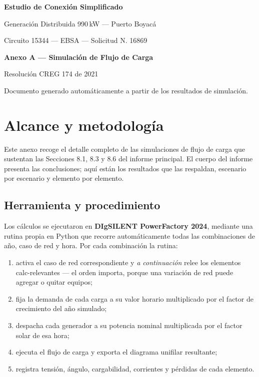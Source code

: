 \documentclass[11pt,a4paper]{article}
\begin{document}
\begin{titlepage}
\centering
\vspace*{3cm}
{\Large\bfseries Estudio de Conexi\'on Simplificado\par}
\vspace{0.4cm}
{\large Generaci\'on Distribuida 990\,kW --- Puerto Boyac\'a\par}
\vspace{0.2cm}
{\large Circuito 15344 --- EBSA --- Solicitud N.\textdegree{} 16869\par}
\vspace{2.5cm}
{\Huge\bfseries Anexo A --- Simulaci\'on de Flujo de Carga\par}
\vspace{2cm}
{\large Resoluci\'on CREG 174 de 2021\par}
\vfill
{\small Documento generado autom\'aticamente a partir de los resultados de simulaci\'on.\par}
\end{titlepage}

\tableofcontents
\newpage


\section{Alcance y metodolog\'ia}

Este anexo recoge el detalle completo de las simulaciones de flujo de carga que
sustentan las Secciones 8.1, 8.3 y 8.6 del informe principal. El cuerpo del
informe presenta las conclusiones; aqu\'i est\'an los resultados que las
respaldan, escenario por escenario y elemento por elemento.

\subsection{Herramienta y procedimiento}

Los c\'alculos se ejecutaron en \textbf{DIgSILENT PowerFactory 2024}, mediante
una rutina propia en Python que recorre autom\'aticamente todas las
combinaciones de a\~no, caso de red y hora. Por cada combinaci\'on la rutina:

\begin{enumerate}
\item activa el caso de red correspondiente y \emph{a continuaci\'on} relee los
elementos calc-relevantes --- el orden importa, porque una variaci\'on de red
puede agregar o quitar equipos;
\item fija la demanda de cada carga a su valor horario multiplicado por el
factor de crecimiento del a\~no simulado;
\item despacha cada generador a su potencia nominal multiplicada por el factor
solar de esa hora;
\item ejecuta el flujo de carga y exporta el diagrama unifilar resultante;
\item registra tensi\'on, \'angulo, cargabilidad, corrientes y p\'erdidas de
cada elemento.
\end{enumerate}
\end{document}

